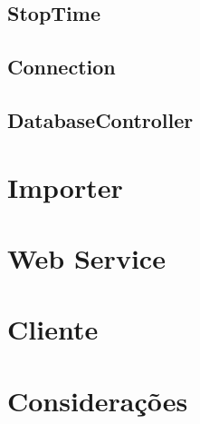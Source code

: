 \subsection{StopTime}

\subsection{Connection}

\subsection{DatabaseController}


\section{Importer}

\section{Web Service}

\section{Cliente}

\section{Considerações}
